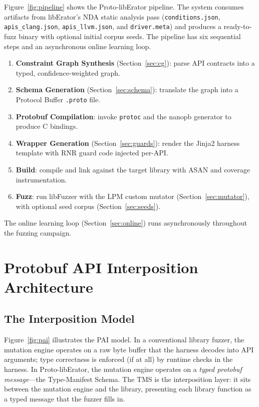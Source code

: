 \documentclass[sigconf,anonymous]{acmart}
\begin{document}
Figure~\ref{fig:pipeline} shows the Proto-libErator pipeline.  The system
consumes artifacts from libErator's NDA static analysis pass
(\texttt{conditions.json}, \texttt{apis\_clang.json},
\texttt{apis\_llvm.json}, and \texttt{driver.meta}) and produces a
ready-to-fuzz binary with optional initial corpus seeds.  The pipeline
has six sequential steps and an asynchronous online learning loop.

\begin{enumerate}[label=\textbf{S\arabic*.}]
\item \textbf{Constraint Graph Synthesis} (Section~\ref{sec:cg}): parse
  API contracts into a typed, confidence-weighted graph.
\item \textbf{Schema Generation} (Section~\ref{sec:schema}): translate
  the graph into a Protocol Buffer \texttt{.proto} file.
\item \textbf{Protobuf Compilation}: invoke \texttt{protoc} and the
  nanopb generator to produce C bindings.
\item \textbf{Wrapper Generation} (Section~\ref{sec:guards}): render the
  Jinja2 harness template with RNR guard code injected per-API.
\item \textbf{Build}: compile and link against the target library with
  ASAN and coverage instrumentation.
\item \textbf{Fuzz}: run libFuzzer with the LPM custom mutator
  (Section~\ref{sec:mutator}), with optional seed corpus (Section~\ref{sec:seeds}).
\end{enumerate}

The online learning loop (Section~\ref{sec:online}) runs asynchronously
throughout the fuzzing campaign.

\section{Protobuf API Interposition Architecture}
\label{sec:pai}

\subsection{The Interposition Model}

Figure~\ref{fig:pai} illustrates the PAI model.  In a conventional
library fuzzer, the mutation engine operates on a raw byte buffer that
the harness decodes into API arguments; type correctness is enforced (if
at all) by runtime checks in the harness.  In Proto-libErator, the
mutation engine operates on a \emph{typed protobuf message}---the
Type-Manifest Schema.  The TMS is the interposition layer: it sits
between the mutation engine and the library, presenting each library
function as a typed message that the fuzzer fills in.
\end{document}
